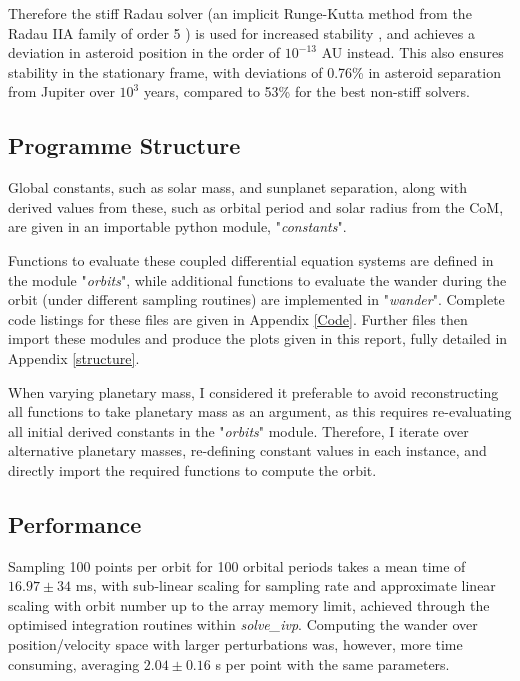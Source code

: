 \documentclass[11pt, a4paper,twocolumn]{article} %
\begin{document}
Therefore the stiff Radau solver (an implicit Runge-Kutta method from the Radau IIA family of order 5 \cite{Hairer2010}) is used for increased stability \cite{Frank1985}, and achieves a deviation in asteroid position in the order of $ 10^{-13}$ AU instead. This also ensures stability in the stationary frame, with deviations of 0.76\% in asteroid separation from Jupiter over $ 10^{3} $ years, compared to 53\% for the best non-stiff solvers.


\subsection{Programme Structure}
Global constants, such as solar mass, and sun\textendash planet separation, along with derived values from these, such as orbital period and solar radius from the CoM, are given in an importable python module, "\textit{constants}".

Functions to evaluate these coupled differential equation systems are defined in the module "\textit{orbits}", while additional functions to evaluate the wander during the orbit (under different sampling routines) are implemented in "\textit{wander}". Complete code listings for these files are given in Appendix \ref{Code}. Further files then import these modules and produce the plots given in this report, fully detailed in Appendix \ref{structure}.

When varying planetary mass, I considered it preferable to avoid reconstructing all functions to take planetary mass as an argument, as this requires re-evaluating all initial derived constants in the "\textit{orbits}" module. Therefore, I iterate over alternative planetary masses, re-defining constant values in each instance, and directly import the required functions to compute the orbit. 


\subsection{Performance} \label{Performance}
Sampling 100 points per orbit for 100 orbital periods takes a mean time of $16.97 \pm 34$ \si{\milli\second}, with sub-linear scaling for sampling rate and approximate linear scaling with orbit number up to the array memory limit, achieved through the optimised integration routines within \textit{solve\_ivp}. Computing the wander over position/velocity space with larger perturbations was, however, more time consuming, averaging $2.04 \pm 0.16$ \si{\second} per point with the same parameters. 
\end{document}
